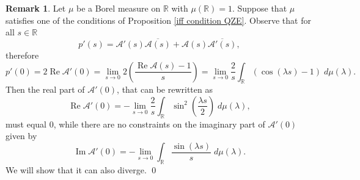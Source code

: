 \documentclass[aip,jmp,12pt
]{revtex4}
\renewcommand{\Re}{\mathop{\mathrm{Re}}\nolimits}
\renewcommand{\Im}{\mathop{\mathrm{Im}}\nolimits}
\newcommand{\RM}{\mathbb{R}}
\theoremstyle{definition}
\newtheorem{remark}{Remark}
\begin{document}
\begin{remark}
Let $\mu$ be a Borel measure on $\RM$ with $\mu(\RM)=1$. 
Suppose that $\mu$ satisfies one of the conditions of Proposition \ref{iff condition QZE}. 
Observe that for all $s \in \RM$
$$
p'(s)=\mathcal{A}'(s)\overline{\mathcal{A}(s)}+\mathcal{A}(s)\overline{\mathcal{A}'(s)},
$$
therefore
$$
p'(0)=2\Re \mathcal{A}'(0)=\lim_{s \to 0} 2 \left(\frac{\Re \mathcal{A}(s)-1}{s}\right)=\lim_{s \to 0} \frac{2}{s} \int_{\RM} (\cos ( \lambda s) -1)\; d\mu(\lambda).
$$
Then the real part of $\mathcal{A}'(0)$, that can be rewritten as
\[
\Re \mathcal{A}'(0)=- \lim_{s \to 0} \frac{2}{s} \int_{\RM} \sin^2\left(\frac{\lambda s}{2}\right)\; d\mu(\lambda),
\]
must equal $0$, while there are no constraints on the imaginary part of $\mathcal{A}'(0)$ given by
\[
\Im \mathcal{A}'(0)=- \lim_{s \to 0} \int_{\RM} \frac{\sin(\lambda s)}{s}\; d\mu(\lambda).
\]
We will show that it can also diverge. \qed
\end{remark}
\end{document}
